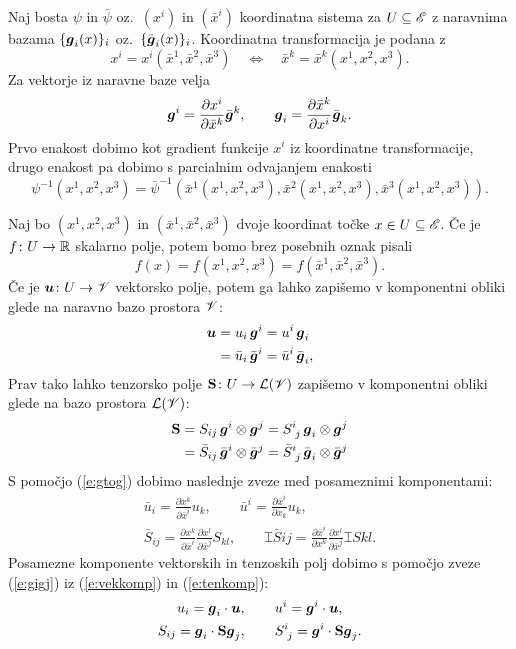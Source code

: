 Naj bosta $\psi$ in $\bar{\psi}$ oz.~$(x^i)$ in $(\bar{x}^i)$ koordinatna sistema za
$U\subseteq\mathscr E$ z naravnima bazama $\{\boldsymbol g_i(x)\}_i$ oz.~$\{\bar{\boldsymbol g}_i(x)\}_i$.
Koordinatna transformacija je podana z
\[
	x^i=x^i(\bar{x}^1,\bar{x}^2,\bar{x}^3)\quad\Longleftrightarrow\quad
	\bar{x}^k=\bar{x}^k(x^1,x^2,x^3).
\]
Za vektorje iz naravne baze velja
\begin{equation} \label{e:gtog}
	\boldsymbol g^i=\frac{\partial x^i}{\partial\bar{x}^k}\bar{\boldsymbol g}^k,\qquad
	\boldsymbol g_i=\frac{\partial\bar{x}^k}{\partial x^i}\bar{\boldsymbol g}_k.
\end{equation}
Prvo enakost dobimo kot gradient funkcije $x^i$ iz koordinatne transformacije,
drugo enakost pa dobimo s parcialnim odvajanjem enakosti
\[ 
	\psi^{-1}(x^1,x^2,x^3)=\bar{\psi}^{-1}(\bar{x}^1(x^1,x^2,x^3),
	\bar{x}^2(x^1,x^2,x^3),\bar{x}^3(x^1,x^2,x^3)).
\]

Naj bo $(x^1,x^2,x^3)$ in $(\bar{x}^1,\bar{x}^2,\bar{x}^3)$ dvoje koordinat točke $x\in U\subseteq\mathscr E$.
Če je $f\colon U\to\mathbb R$ skalarno polje, potem bomo brez posebnih oznak pisali
\[ f(x)=f(x^1,x^2,x^3)=f(\bar{x}^1,\bar{x}^2,\bar{x}^3). \]
Če je $\boldsymbol u\colon U\to\mathscr V$ vektorsko polje, potem ga lahko zapišemo v komponentni
obliki glede na naravno bazo prostora $\mathscr V$:
\begin{align}
	\boldsymbol u&=u_i\,\boldsymbol g^i=u^i\,\boldsymbol g_i \nonumber \\
	&=\bar{u}_i\,\bar{\boldsymbol g}^i=\bar{u}^i\,\bar{\boldsymbol g}_i, \label{e:vekkomp}
\end{align}
Prav tako lahko tenzorsko polje $\mathbf S\colon U\to\mathcal L(\mathscr V)$ zapišemo v
komponentni obliki glede na bazo prostora $\mathcal L(\mathscr V)$:
\begin{align}
	\ten{S}&=S_{ij}\,\vek{g}^i\otimes\vek{g}^j=\topbot{S}{i}{j}\,\vek{g}_i\otimes\vek{g}^j \nonumber \\
	&=\bar{S}_{ij}\,\bar{\vek{g}}^i\otimes\bar{\vek{g}}^j=
	\topbot{\bar{S}}{i}{j}\,\bar{\vek{g}}_i\otimes\bar{\vek{g}}^j \label{e:tenkomp}
\end{align}
S pomočjo (\ref{e:gtog}) dobimo naslednje zveze med posameznimi komponentami:
\begin{gather*}
	\bar{u}_i=\frac{\partial x^k}{\partial\bar{x}^i}u_k, \qquad
	\bar{u}^i=\frac{\partial\bar{x}^i}{\partial x_k}u_k, \\
	\bar{S}_{ij}=\frac{\partial x^k}{\partial\bar{x}^i}\frac{\partial x^l}{\partial\bar{x}^j}S_{kl}, \qquad
	\topbot{\bar{S}}{i}{j}=\frac{\partial\bar{x}^i}{\partial x^k}\frac{\partial x^l}{\partial\bar{x}^j}\topbot{S}{k}{l}.
\end{gather*}
Posamezne komponente vektorskih in tenzoskih polj dobimo s pomočjo zveze (\ref{e:gigj})
iz (\ref{e:vekkomp}) in (\ref{e:tenkomp}):
\begin{gather}
	u_i=\vek{g}_i\cdot\vek{u},\qquad u^i=\vek{g}^i\cdot\vek{u}, \label{e:kompvek} \\
	S_{ij}=\vek{g}_i\cdot\ten{S}\vek{g}_j,\qquad\topbot{S}{i}{j}=\vek{g}^i\cdot\ten{S}\vek{g}_j.\label{e:kompten}
\end{gather}


